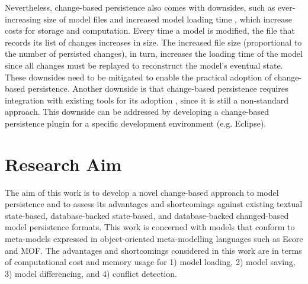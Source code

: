 Nevertheless, change-based persistence also comes with downsides, such as ever-increasing size of model files \cite{DBLP:journals/entcs/RobbesL07,DBLP:conf/edoc/KoegelHLHD10} and increased model loading time \cite{mens2002state}, which increase costs for storage and computation. Every time a model is modified, the file that records its list of changes increases in size. The increased file size (proportional to the number of persisted changes), in turn, increases the loading time of the model since all changes must be replayed to reconstruct the model’s eventual state. These downsides need to be mitigated to enable the practical adoption of change-based persistence. Another downside is that change-based persistence requires integration with existing tools for its adoption \cite{koegel2010emfstore}, since it is still a non-standard approach. This downside can be addressed by developing a change-based persistence plugin for a specific development environment (e.g. Eclipse).

\section{Research Aim}
\label{sec:research_aim}
The aim of this work is to develop a novel change-based approach to model persistence and to assess its advantages and shortcomings against existing textual state-based, database-backed state-based, and database-backed changed-based model persistence formats. This work is concerned with models that conform to meta-models expressed in object-oriented meta-modelling languages such as Ecore \cite{steinberg2008emf} and MOF. The advantages and shortcomings considered in this work are in terms of computational cost and memory usage for 1) model loading, 2) model saving, 3) model differencing, and 4) conflict detection.

